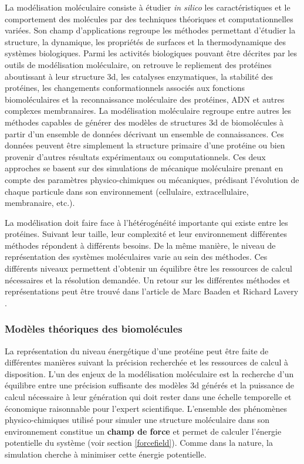 La modélisation moléculaire consiste à étudier \textit{in silico} les caractéristiques et le comportement des molécules par des techniques théoriques et computationnelles variées. Son champ d'applications regroupe les méthodes permettant d'étudier la structure, la dynamique, les propriétés de surfaces et la thermodynamique des systèmes biologiques. Parmi les activités biologiques pouvant être décrites par les outils de modélisation moléculaire, on retrouve le repliement des protéines aboutissant à leur structure 3d, les catalyses enzymatiques, la stabilité des protéines, les changements conformationnels associés aux fonctions biomoléculaires et la reconnaissance moléculaire des protéines, ADN et autres complexes membranaires.
La modélisation moléculaire regroupe entre autres les méthodes capables de générer des modèles de structures 3d de biomolécules à partir d'un ensemble de données décrivant un ensemble de connaissances. Ces données peuvent être simplement la structure primaire d'une protéine ou bien provenir d'autres résultats expérimentaux ou computationnels. Ces deux approches se basent sur des simulations de mécanique moléculaire prenant en compte des paramètres physico-chimiques ou mécaniques, prédisant l'évolution de chaque particule dans son environnement (cellulaire, extracellulaire, membranaire, etc.).

La modélisation doit faire face à l'hétérogénéité importante qui existe entre les protéines. Suivant leur taille, leur complexité et leur environnement différentes méthodes répondent à différents besoins. De la même manière, le niveau de représentation des systèmes moléculaires varie au sein des méthodes. Ces différents niveaux permettent d'obtenir un équilibre être les ressources de calcul nécessaires et la résolution demandée. Un retour sur les différentes méthodes et représentations peut être trouvé dans l'article de Marc Baaden et Richard Lavery \cite{baaden2007there}.


\subsubsection{Modèles théoriques des biomolécules}

La représentation du niveau énergétique d'une protéine peut être faite de différentes manières suivant la précision recherchée et les ressources de calcul à disposition. L'un des enjeux de la modélisation moléculaire est la recherche d'un équilibre entre une précision suffisante des modèles 3d générés et la puissance de calcul nécessaire à leur génération qui doit rester dans une échelle temporelle et économique raisonnable pour l'expert scientifique.
L'ensemble des phénomènes physico-chimiques utilisé pour simuler une structure moléculaire dans son environnement constitue un \textbf{champ de force} et permet de calculer l'énergie potentielle du système (voir section \ref{forcefield}). Comme dans la nature, la simulation cherche à minimiser cette énergie potentielle.

